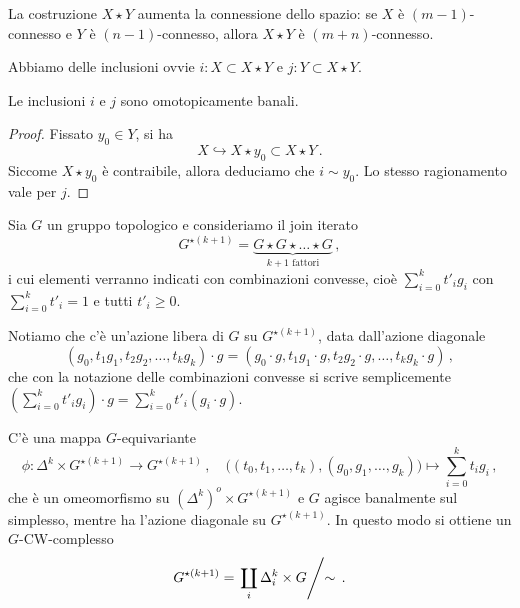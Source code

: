 \begin{exercise}
	La costruzione $X \star Y$ aumenta la connessione dello spazio:
	se $X$ è $(m-1)$-connesso e $Y$ è $(n-1)$-connesso,
	allora $X \star Y$ è $(m+n)$-connesso.
\end{exercise}


Abbiamo delle inclusioni ovvie $i:X \subset X \star Y$ e $j:Y \subset X \star Y$.

\begin{lemma}
	Le inclusioni $i$ e $j$ sono omotopicamente banali.
	\begin{proof}
		Fissato $y_{0} \in Y$, si ha
		\begin{equation*}
			X \hookrightarrow X \star y_{0} \subset X \star Y\,.
		\end{equation*}
		Siccome $X \star y_{0}$ è contraibile, allora deduciamo che
		$i \sim y_{0}$. Lo stesso ragionamento vale per $j$.
	\end{proof}
\end{lemma}


Sia $G$ un gruppo topologico e consideriamo il join iterato
\begin{equation*}
	G^{\star(k+1)} = \underbrace{G \star G \star \dots \star G}_{k+1 \text{ fattori}}\,,
\end{equation*}
i cui elementi verranno indicati con combinazioni convesse, cioè 
$\sum_{i=0}^{k}t'_{i}g_{i}$ con $\sum_{i=0}^{k}t'_{i}=1$ e tutti $t'_{i} \ge 0$.

Notiamo che c'è un'azione libera di $G$ su $G^{\star(k+1)}$,
data dall'azione diagonale
\begin{equation*}
	(g_{0}, t_{1}g_{1}, t_{2}g_{2}, \dots, t_{k}g_{k}) \cdot g
	= (g_{0}\cdot g, t_{1}g_{1}\cdot g, t_{2}g_{2}\cdot g, \dots, t_{k}g_{k}\cdot g)\,,
\end{equation*}
che con la notazione delle combinazioni convesse si scrive semplicemente 
$\left( \sum_{i=0}^{k}t'_{i}g_{i} \right) \cdot g = \sum_{i=0}^{k}t'_{i}(g_{i} \cdot g)$. 


\begin{exercise}
	C'è una mappa $G$-equivariante 
	\begin{equation*}
		\phi: \Delta^{k} \times G^{\star(k+1)} \longrightarrow G^{\star(k+1)}\,,
		\quad \Big((t_{0}, t_{1}, \dots, t_{k}), (g_{0}, g_{1}, \dots, g_{k}) \Big)
		\longmapsto \sum_{i=0}^{k}t_{i}g_{i}\,,
	\end{equation*}
	che è un omeomorfismo su  $(\Delta^{k})^{o} \times G^{\star(k+1)}$
	e $G$ agisce banalmente sul simplesso, mentre ha l'azione diagonale su $G^{\star(k+1)}$.
	In questo modo si ottiene un $G$-CW-complesso
	\begin{equation*}
		G^{\star(k+1)} = \left. \coprod_{i} \Delta^{k}_{i} \times G \middle/ \sim \right. \,.
	\end{equation*}
\end{exercise}

